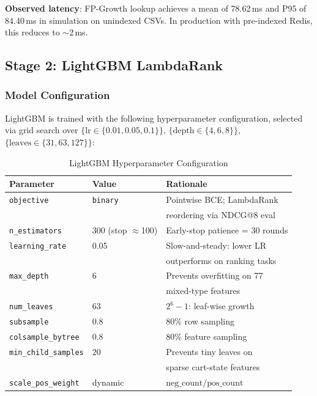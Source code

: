 \documentclass[conference]{IEEEtran}
\begin{document}
\textbf{Observed latency}: FP-Growth lookup achieves a mean of 78.62\,ms and
P95 of 84.40\,ms in simulation on unindexed CSVs. In production with
pre-indexed Redis, this reduces to $\sim$2\,ms.

\subsection{Stage 2: LightGBM LambdaRank}

\subsubsection{Model Configuration}

LightGBM \cite{ke2017lightgbm} is trained with the following hyperparameter
configuration, selected via grid search over
$\{\text{lr} \in \{0.01, 0.05, 0.1\}\}$,
$\{\text{depth} \in \{4, 6, 8\}\}$,
$\{\text{leaves} \in \{31, 63, 127\}\}$:

\begin{table}[h]
\caption{LightGBM Hyperparameter Configuration}
\centering
\begin{tabular}{lll}
\toprule
Parameter & Value & Rationale \\
\midrule
\texttt{objective}        & \texttt{binary}  & Pointwise BCE; LambdaRank \\
                          &                   & reordering via NDCG@8 eval \\
\texttt{n\_estimators}    & 300 (stop $\approx$100) & Early-stop patience = 30 rounds \\
\texttt{learning\_rate}   & 0.05             & Slow-and-steady: lower LR \\
                          &                   & outperforms on ranking tasks \\
\texttt{max\_depth}       & 6                & Prevents overfitting on 77 \\
                          &                   & mixed-type features \\
\texttt{num\_leaves}      & 63               & $2^6 - 1$: leaf-wise growth \\
\texttt{subsample}        & 0.8              & 80\% row sampling \\
\texttt{colsample\_bytree}& 0.8              & 80\% feature sampling \\
\texttt{min\_child\_samples} & 20            & Prevents tiny leaves on \\
                          &                   & sparse cart-state features \\
\texttt{scale\_pos\_weight} & dynamic        & $\text{neg\_count}/\text{pos\_count}$ \\
\bottomrule
\end{tabular}
\end{table}
\end{document}
